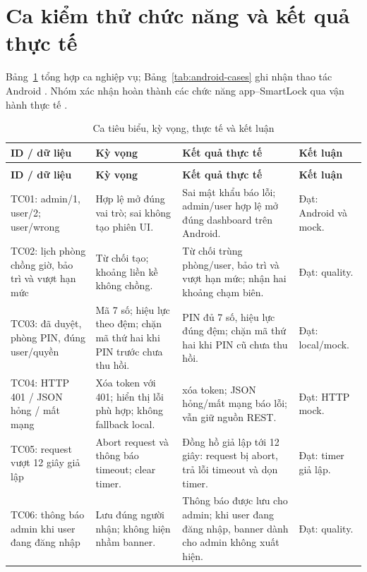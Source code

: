 \section{Ca kiểm thử chức năng và kết quả thực tế}
Bảng~\ref{tab:cases} tổng hợp ca nghiệp vụ; Bảng~\ref{tab:android-cases} ghi nhận thao tác Android \cite{qualityreport,devicereport,currenttests}. Nhóm xác nhận hoàn thành các chức năng app--SmartLock qua vận hành thực tế \cite{systemacceptance}.
{\tabletext\renewcommand{\arraystretch}{1.04}\begin{longtable}{>{\raggedright\arraybackslash}p{}>{\raggedright\arraybackslash}p{}>{\raggedright\arraybackslash}p{}>{\raggedright\arraybackslash}p{}}
\caption{Ca tiêu biểu, kỳ vọng, thực tế và kết luận}\label{tab:cases}\\
\toprule \textbf{ID / dữ liệu} & \textbf{Kỳ vọng} & \textbf{Kết quả thực tế} & \textbf{Kết luận}\\\midrule
\endfirsthead
\multicolumn{4}{l}{\small Ca tiêu biểu, kỳ vọng, thực tế và kết luận (tiếp)}\\
\toprule \textbf{ID / dữ liệu} & \textbf{Kỳ vọng} & \textbf{Kết quả thực tế} & \textbf{Kết luận}\\\midrule
\endhead
\bottomrule\endlastfoot
TC01: admin/1, user/2; user/wrong & Hợp lệ mở đúng vai trò; sai không tạo phiên UI. & Sai mật khẩu báo lỗi; admin/user hợp lệ mở đúng dashboard trên Android. & Đạt: Android và mock.\\
TC02: lịch phòng chồng giờ, bảo trì và vượt hạn mức & Từ chối tạo; khoảng liền kề không chồng. & Từ chối trùng phòng/user, bảo trì và vượt hạn mức; nhận hai khoảng chạm biên. & Đạt: quality.\\
TC03: đã duyệt, phòng PIN, đúng user/quyền & Mã 7 số; hiệu lực theo đệm; chặn mã thứ hai khi PIN trước chưa thu hồi. & PIN đủ 7 số, hiệu lực đúng đệm; chặn mã thứ hai khi PIN cũ chưa thu hồi. & Đạt: local/mock.\\
TC04: HTTP 401 / JSON hỏng / mất mạng & Xóa token với 401; hiển thị lỗi phù hợp; không fallback local. & 401 xóa token; JSON hỏng/mất mạng báo lỗi; vẫn giữ nguồn REST. & Đạt: HTTP mock.\\
TC05: request vượt 12 giây giả lập & Abort request và thông báo timeout; clear timer. & Đồng hồ giả lập tới 12 giây: request bị abort, trả lỗi timeout và dọn timer. & Đạt: timer giả lập.\\
TC06: thông báo admin khi user đang đăng nhập & Lưu đúng người nhận; không hiện nhầm banner. & Thông báo được lưu cho admin; khi user đang đăng nhập, banner dành cho admin không xuất hiện. & Đạt: quality.\\

\end{longtable}}
